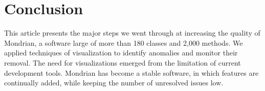 \documentclass[runningheads]{llncs}
\newcommand{\seclabel}[1]{\label{sec:#1}}
\begin{document}
%



%


\section{Conclusion} \seclabel{conclusion}

This article presents the major steps we went through at increasing the quality of Mondrian, a software large of more than 180 classes and 2,000 methods. We applied techniques of visualization to identify anomalies and monitor their removal. 
The need for visualizations emerged from the limitation of current development tools. 
Mondrian has become a stable software, in which features are continually added, while keeping the number of unresolved issues low.




{\small


}
\end{document}
